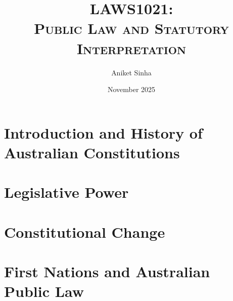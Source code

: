 \documentclass[12pt]{book}
\title{\Huge\bfseries\scshape LAWS1021: \\ Public Law and Statutory Interpretation}
\author{Aniket Sinha}
\date{November 2025}
\begin{document}
\maketitle

\frontmatter

\tableofcontents

\renewcommand{\numberline}[1]{#1\hspace{1em}} %




\flushleft

\mainmatter

\chapter{Introduction and History of Australian Constitutions}


\chapter{Legislative Power}


\chapter{Constitutional Change}


\chapter{First Nations and Australian Public Law}

\end{document}
